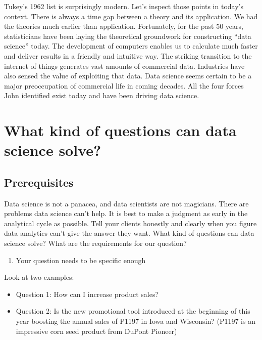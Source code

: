 \documentclass[12pt,]{krantz}
\providecommand{\tightlist}{%
  \setlength{\itemsep}{0pt}\setlength{\parskip}{0pt}}
\theoremstyle{definition}
\theoremstyle{definition}
\theoremstyle{remark}
\begin{document}
Tukey's 1962 list is surprisingly modern. Let's inspect those points in
today's context. There is always a time gap between a theory and its
application. We had the theories much earlier than application.
Fortunately, for the past 50 years, statisticians have been laying the
theoretical groundwork for constructing ``data science'' today. The
development of computers enables us to calculate much faster and deliver
results in a friendly and intuitive way. The striking transition to the
internet of things generates vast amounts of commercial data. Industries
have also sensed the value of exploiting that data. Data science seems
certain to be a major preoccupation of commercial life in coming
decades. All the four forces John identified exist today and have been
driving data science.

\section{What kind of questions can data science
solve?}\label{what-kind-of-questions-can-data-science-solve}

\subsection{Prerequisites}\label{prerequisites}

Data science is not a panacea, and data scientists are not magicians.
There are problems data science can't help. It is best to make a
judgment as early in the analytical cycle as possible. Tell your clients
honestly and clearly when you figure data analytics can't give the
answer they want. What kind of questions can data science solve? What
are the requirements for our question?

\begin{enumerate}
\def\labelenumi{\arabic{enumi}.}
\tightlist
\item
  Your question needs to be specific enough
\end{enumerate}

Look at two examples:

\begin{itemize}
\tightlist
\item
  Question 1: How can I increase product sales?
\item
  Question 2: Is the new promotional tool introduced at the beginning of
  this year boosting the annual sales of P1197 in Iowa and Wisconsin?
  (P1197 is an impressive corn seed product from DuPont Pioneer)
\end{itemize}
\end{document}
